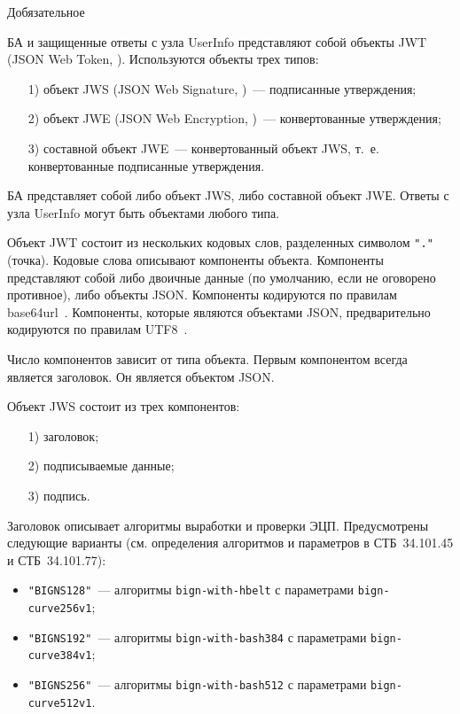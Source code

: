 \begin{appendix}{Д}{обязательное}{}\label{JWT}


БА и защищенные ответы с узла UserInfo представляют собой объекты 
JWT (JSON Web Token, \cite{RFC7519}).
%
Используются объекты трех типов: 
\begin{itemize}
\item[1)] 
объект JWS (JSON Web Signature, \cite{RFC7515})~--- подписанные утверждения;
\item[2)] 
объект JWE (JSON Web Encryption, \cite{RFC7516})~--- конвертованные утверждения;
\item[3)] 
составной объект JWE~--- конвертованный объект JWS, т.~е. конвертованные 
подписанные утверждения.
\end{itemize}

БА представляет собой либо объект JWS, либо составной объект JWЕ.
Ответы с узла UserInfo могут быть объектами любого типа. 

Объект JWT состоит из нескольких кодовых слов, разделенных символом
\lstinline{"."} (точка). Кодовые слова описывают компоненты объекта. 
%
Компоненты представляют собой либо двоичные данные (по умолчанию, если не 
оговорено противное), либо объекты JSON.
%
Компоненты кодируются по правилам base64url~\cite{RFC4648}. 
Компоненты, которые являются объектами JSON, предварительно кодируются по 
правилам UTF8~\cite{UTF8}.

Число компонентов зависит от типа объекта. Первым компонентом всегда является 
заголовок. Он является объектом JSON.

\label{JWT.JWS}

Объект JWS состоит из трех компонентов:
\begin{enumerate}
\item[1)]
заголовок;
\item[2)]
подписываемые данные;
\item[3)]
подпись.
\end{enumerate}

Заголовок описывает алгоритмы выработки и проверки ЭЦП. Предусмотрены следующие 
варианты (см. определения алгоритмов и параметров в СТБ~34.101.45 и 
СТБ~34.101.77): 
\begin{itemize}
\item
\lstinline{"BIGNS128"}~--- алгоритмы \lstinline{bign-with-hbelt} с параметрами  
\lstinline{bign-curve256v1};
\item
\lstinline{"BIGNS192"}~--- алгоритмы \lstinline{bign-with-bash384} с 
параметрами \lstinline{bign-curve384v1};
\item
\lstinline{"BIGNS256"}~--- алгоритмы \lstinline{bign-with-bash512} с 
параметрами \lstinline{bign-curve512v1}.
\end{itemize}


\end{appendix}
